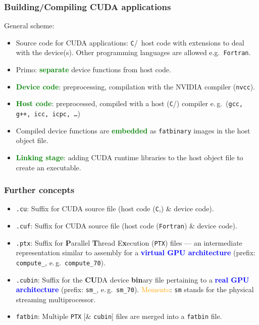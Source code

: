 \begin{frame}
  \frametitle{Building/Compiling CUDA applications}
  General scheme:
  \begin{itemize}
    \item Source code for CUDA applications:
          \texttt{C}/\CC\ host code with extensions to deal with the device(s).
          Other programming languages are allowed e.g.\ \texttt{Fortran}.
    \item Primo: \textbf{\textcolor{green}{separate}} device functions from host code.
    \item \textbf{\textcolor{green}{Device code}}: preprocessing, compilation
          with the NVIDIA compiler (\texttt{nvcc}).
    \item \textbf{\textcolor{green}{Host code}}: preprocessed, compiled with a host
          (\texttt{C}/\CC) compiler e.\,g.\ (\texttt{gcc, g++, icc, icpc, \ldots})
    \item Compiled device functions are \textbf{\textcolor{green}{embedded}} as
          \texttt{fatbinary} images in the host object file.
    \item \textbf{\textcolor{green}{Linking stage}}: adding CUDA runtime libraries
          to the host object file to create an executable.
  \end{itemize}
\end{frame}

\begin{frame}
  \frametitle{Further concepts}
  \begin{itemize}
    \item \texttt{.cu}: Suffix for CUDA source file (host code (\texttt{C},\CC) \& device code).
    \item \texttt{.cuf}: Suffix for CUDA source file (host code (\texttt{Fortran}) \& device code).
    \item \texttt{.ptx}: Suffix for \textbf{P}arallel \textbf{T}hread E\textbf{x}ecution
          (\texttt{PTX}) files --- an intermediate representation similar to assembly
          for a \textbf{\textcolor{blue}{virtual GPU architecture}}
          (prefix: \texttt{compute\_}, e.\,g.\ \texttt{compute\_70}).
    \item \texttt{.cubin}: Suffix for the \textbf{CU}DA device \textbf{bin}ary file
          pertaining to a \textbf{\textcolor{blue}{real GPU architecture}}
          (prefix: \texttt{sm\_}, e.\,g.\ \texttt{sm\_70}).
          \textcolor{orange}{Memento}: \texttt{sm} stands for the physical streaming multiprocessor.
    \item \texttt{fatbin}: Multiple \texttt{PTX} [\& \texttt{cubin}] files are merged
          into a \texttt{fatbin} file.
  \end{itemize}
\end{frame}

